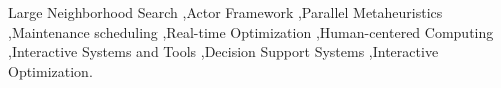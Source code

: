 \documentclass[preprint,12pt,authoryear]{elsarticle}
\begin{document}
\begin{frontmatter}
\begin{keyword}
Large Neighborhood Search
\sep Actor Framework
\sep Parallel Metaheuristics
\sep Maintenance scheduling
\sep Real-time Optimization
\sep Human-centered Computing
\sep Interactive Systems and Tools
\sep Decision Support Systems
\sep Interactive Optimization.



\end{keyword}

\end{frontmatter}









\end{document}
